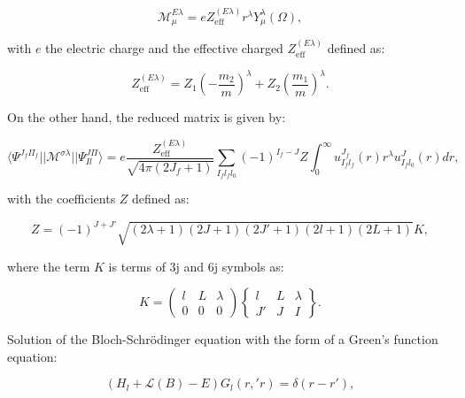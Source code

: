 \documentclass[openany]{book}
\begin{document}
\begin{equation}\label{rmatrix_radiativeCapture_M}
	\mathcal{M}^{E\lambda}_{\mu} = eZ^{(E\lambda)}_{\mathrm{eff}} r^{\lambda} Y^{\lambda}_{\mu} (\Omega),
\end{equation}

with $e$ the electric charge and the effective charged $Z^{(E\lambda)}_{\mathrm{eff}}$ defined as: 

\begin{equation}\label{rmatrix_radiativeCapture_effectiveCharge}
		Z^{(E\lambda)}_{\mathrm{eff}} = Z_1\left(- \frac{m_2}{m}\right)^{\lambda} + Z_2 \left(\frac{m_1}{m}\right)^{\lambda}.
\end{equation}

On the other hand, the reduced matrix is given by: 

\begin{equation}\label{rmatrix_radiativeCapture_reducedMatrix_expression}
	\langle \Psi^{J_f\Pi_f} || \mathcal{M}^{\sigma \lambda} ||  \Psi^{J \Pi}_{Il} \rangle = e \frac{Z^{(E\lambda)}_{\mathrm{eff}}}{\sqrt{4\pi (2J_f + 1)}} \sum_{I_fl_fl_0}(-1)^{I_f - J} Z \int_0^{\infty} {u^{J_f}_{I_fl_f}(r) r^\lambda u^{J}_{I_fl_0} (r)dr}, 
\end{equation}

with the coefficients $Z$ defined as: 

\begin{equation}\label{rmatrix_radiativeCapture_Zcoefficients}
	Z = (-1)^{J + J'} \sqrt{(2\lambda + 1)(2J+ 1)(2J' + 1)(2l + 1)(2L + 1)} K ,
\end{equation}

where the term $K$ is terms of 3j and 6j symbols as: 

\begin{equation}\label{rmatrix_radiativeCapture_3j6j}
	K  = \left(\begin{matrix}
		l & L & \lambda \\
		0 & 0 & 0
	\end{matrix}\right) \left\{ \begin{matrix}
		l & L & \lambda \\
		J' & J & I
\end{matrix} \right\}.
\end{equation}



 
Solution of the Bloch-Schrödinger equation with the form of a Green's function equation:

\begin{equation}\label{rmatrix_BlochSchrodinger}
	(H_l + \mathcal{L}(B) - E)G_l(r, 'r) = \delta(r - r'),
\end{equation}
\end{document}
